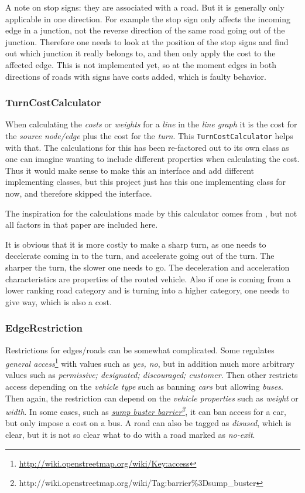 \documentclass[../main.tex]{subfiles}
\begin{document}
A note on stop signs: they are associated with a road. But it is generally only applicable in one direction. For example the stop sign only affects the incoming edge in a junction, not the reverse direction of the same road going out of the junction. Therefore one needs to look at the position of the stop signs and find out which junction it really belongs to, and then only apply the cost to the affected edge. This is not implemented yet, so at the moment edges in both directions of roads with signs have costs added, which is faulty behavior.

\subsubsection{TurnCostCalculator}
When calculating the \textit{costs} or \textit{weights} for a \textit{line} in the \textit{line graph} it is the cost for the \textit{source node/edge} plus the cost for the \textit{turn}. This \texttt{TurnCostCalculator} helps with that. The calculations for this has been re-factored out to its own class as one can imagine wanting to include different properties when calculating the cost. Thus it would make sense to make this an interface and add different implementing classes, but this project just has this one implementing class for now, and therefore skipped the interface.

The inspiration for the calculations made by this calculator comes from \cite{volker-turncost}, but not all factors in that paper are included here.

It is obvious that it is more costly to make a sharp turn, as one needs to decelerate coming in to the turn, and accelerate going out of the turn. The sharper the turn, the slower one needs to go. The deceleration and acceleration characteristics are properties of the routed vehicle.  Also if one is coming from a lower ranking road category and is turning into a higher category, one needs to give way, which is also a cost.

\subsubsection{EdgeRestriction}\label{sect:edge-restriction}
Restrictions for edges/roads can be somewhat complicated. Some regulates \textit{general access}\footnote{\url{http://wiki.openstreetmap.org/wiki/Key:access}} with values such as \textit{yes, no}, but in addition much more arbitrary values such as \textit{permissive; designated; discouraged; customer}. Then other restricts access depending on the \textit{vehicle type} such as banning \textit{cars} but allowing \textit{buses}. Then again, the restriction can depend on the \textit{vehicle properties} such as \textit{weight} or \textit{width}. In some cases, such as \href{http://wiki.openstreetmap.org/wiki/Tag:barrier\%3Dsump_buster}{\textit{sump buster barrier\footnote{\url{http://wiki.openstreetmap.org/wiki/Tag:barrier\%3Dsump_buster}}}}, it can ban access for a car, but only impose a cost on a bus. A road can also be tagged as \textit{disused}, which is clear, but it is not so clear what to do with a road marked as \textit{no-exit}.
\end{document}
